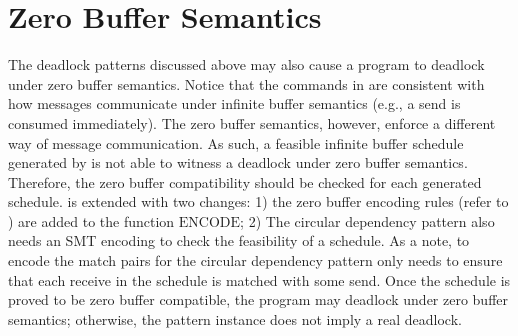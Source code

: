 \section{Zero Buffer Semantics}
The deadlock patterns discussed above may also cause a program to deadlock under zero buffer semantics. Notice that the commands in  are consistent with how messages communicate under infinite buffer semantics (e.g., a send is consumed immediately). The zero buffer semantics, however, enforce a different way of message communication. As such, a feasible infinite buffer schedule generated by  is not able to witness a deadlock under zero buffer semantics. Therefore, the zero buffer compatibility should be checked for each generated schedule.  is extended with two changes: 1) the zero buffer encoding rules (refer to \cite{HuangNFM15}) are added to the function $\mathrm{ENCODE}$; 2) The circular dependency pattern also needs an SMT encoding to check the feasibility of a schedule. As a note, to encode the match pairs for the circular dependency pattern only needs to ensure that each receive in the schedule is matched with some send. Once the schedule is proved to be zero buffer compatible, the program may deadlock under zero buffer semantics; otherwise, the pattern instance does not imply a real deadlock. 